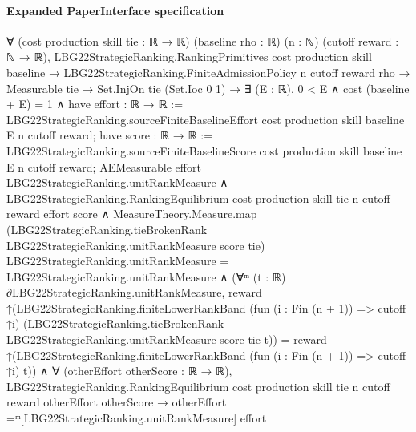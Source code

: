 \documentclass[10pt]{article}
\begin{document}
\paragraph{Expanded PaperInterface specification}
\begin{ReviewVerbatim}
∀ (cost production skill tie : ℝ → ℝ) (baseline rho : ℝ) (n : ℕ) (cutoff reward : ℕ → ℝ),
  LBG22StrategicRanking.RankingPrimitives cost production skill baseline →
    LBG22StrategicRanking.FiniteAdmissionPolicy n cutoff reward rho →
      Measurable tie →
        Set.InjOn tie (Set.Ioc 0 1) →
          ∃ (E : ℝ),
            0 < E ∧
              cost (baseline + E) = 1 ∧
                have effort : ℝ → ℝ :=
                  LBG22StrategicRanking.sourceFiniteBaselineEffort cost production skill baseline E n cutoff reward;
                have score : ℝ → ℝ :=
                  LBG22StrategicRanking.sourceFiniteBaselineScore cost production skill baseline E n cutoff reward;
                AEMeasurable effort LBG22StrategicRanking.unitRankMeasure ∧
                  LBG22StrategicRanking.RankingEquilibrium cost production skill tie n cutoff reward effort score ∧
                    MeasureTheory.Measure.map
                          (LBG22StrategicRanking.tieBrokenRank LBG22StrategicRanking.unitRankMeasure score tie)
                          LBG22StrategicRanking.unitRankMeasure =
                        LBG22StrategicRanking.unitRankMeasure ∧
                      (∀ᵐ (t : ℝ) ∂LBG22StrategicRanking.unitRankMeasure,
                          reward
                              ↑(LBG22StrategicRanking.finiteLowerRankBand (fun (i : Fin (n + 1)) => cutoff ↑i)
                                  (LBG22StrategicRanking.tieBrokenRank LBG22StrategicRanking.unitRankMeasure score tie
                                    t)) =
                            reward
                              ↑(LBG22StrategicRanking.finiteLowerRankBand (fun (i : Fin (n + 1)) => cutoff ↑i) t)) ∧
                        ∀ (otherEffort otherScore : ℝ → ℝ),
                          LBG22StrategicRanking.RankingEquilibrium cost production skill tie n cutoff reward otherEffort
                              otherScore →
                            otherEffort =ᵐ[LBG22StrategicRanking.unitRankMeasure] effort
\end{ReviewVerbatim}
\end{document}
